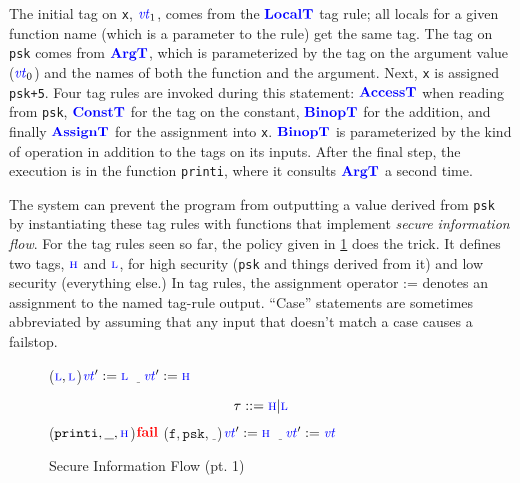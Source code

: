 \documentclass{llncs}
\begin{document}
The initial tag on {\tt x}, \(\mathit{\color{blue} vt}_1\), comes from the \(\color{blue} \mathbf{LocalT}\) tag rule; all locals for a given function
name (which is a parameter to the rule) get the same tag. 
  The tag on {\tt psk}
comes from \(\color{blue} \mathbf{ArgT}\), which is parameterized by the tag on the argument value (\(\mathit{\color{blue} vt}_0\)) and
the names of both the function and the argument. Next, {\tt x} is assigned {\tt psk+5}.
Four tag rules are invoked during this statement: \(\color{blue} \mathbf{AccessT}\) when reading
from {\tt psk}, \(\color{blue} \mathbf{ConstT}\) for the tag on the constant, \(\color{blue} \mathbf{BinopT}\) for the addition,
and finally \(\color{blue} \mathbf{AssignT}\) for the assignment into {\tt x}. \(\color{blue} \mathbf{BinopT}\) is parameterized
by the kind of operation in addition to the tags on its inputs.
After the final step, the execution is in the function {\tt printi}, where it consults
\(\color{blue} \mathbf{ArgT}\) a second time.

The system can prevent the program from outputting a value derived from {\tt psk} by instantiating these tag rules with
functions that implement {\em secure information flow}. For the tag rules seen so far, the policy given in
\cref{fig:example1rules} does the trick. It defines two tags, \(\textnormal{\color{blue} \sc h}\) and \(\textnormal{\color{blue} \sc l}\), for high
security ({\tt psk} and things derived from it) and low security (everything else.) In tag rules,
the assignment operator := denotes an assignment to the named tag-rule output. 
``Case'' statements are sometimes abbreviated by assuming that any input that doesn't match a case causes a failstop.

\begin{figure}
  \begin{minipage}{0.5\textwidth}
    \consttruleblock{\(\vt := \low\)}
    \localtruleblock{\(\vt := \low\)}

    \binoptruleblock
        {
          {(\(\textnormal{\color{blue} \sc l},\textnormal{\color{blue} \sc l}\))}{\(\mathit{\color{blue} vt}':=\textnormal{\color{blue} \sc l}\)}
          {\(\underline{~~~}\)}{\(\mathit{\color{blue} vt}':=\textnormal{\color{blue} \sc h}\)}}
  \end{minipage}
  \begin{minipage}{0.4\textwidth}
    \[\tau::=\textnormal{\color{blue} \sc h} | \textnormal{\color{blue} \sc l}\]
    \argtruleblock
        {
          {(\(\mathtt{printi},\underline{~~},\textnormal{\color{blue} \sc h}\))}{\(\mathbf{\color{red} fail}\)}
          {(\(\mathtt{f},\mathtt{psk},\underline{~~}\))}{\(\mathit{\color{blue} vt}':=\textnormal{\color{blue} \sc h}\)}
          {\(\underline{~~~}\)}{\(\mathit{\color{blue} vt}':=\mathit{\color{blue} vt}\)}}
  \end{minipage}

  \caption{Secure Information Flow (pt. 1)}
  \label{fig:example1rules}
\end{figure}
\end{document}
